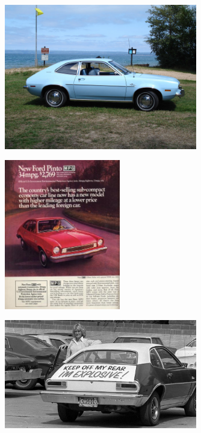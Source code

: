 \documentclass[aspectratio=1610,pdftex,dvipsnames,compress,xcolor={dvipsnames}]{beamer}
\begin{document}
\begin{frame}{}
    \begin{figure}
        \centering
        \includegraphics[width=0.75\textwidth]{blue.pinto.jpg}
    \end{figure}
\end{frame}


\begin{frame}{}
    \begin{figure}
        \centering
        \includegraphics[width=0.45\textwidth]{pinto.ad.jpg}
    \end{figure}
\end{frame}


\begin{frame}{}
    \begin{figure}
        \centering
        \includegraphics[width=0.75\textwidth]{pinto.rear.jpg}
    \end{figure}
\end{frame}
\end{document}
